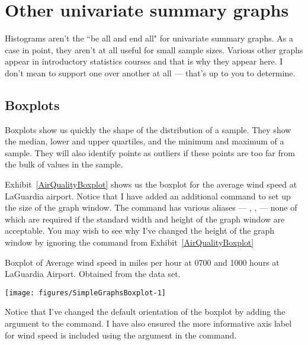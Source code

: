 \section{Other univariate summary graphs}

Histograms aren't the ``be all and end all" for univariate summary graphs. As a case in point, they aren't at all useful for small sample sizes. Various other graphs appear in introductory statistics courses and that is why they appear here. I don't mean to support one over another at all --- that's up to you to determine.

\subsection{Boxplots}

Boxplots show us quickly the shape of the distribution of a sample. They show the median, lower and upper quartiles, and the minimum and maximum of a sample. They will also identify points as outliers if these points are too far from the bulk of values in the sample.

Exhibit~\ref{AirQualityBoxplot} shows us the boxplot for the average wind speed at LaGuardia airport. Notice that I have added an additional command to set up the size of the graph window. The  command has various aliases --- , ,  --- none of which are required if the standard width and height of the graph window are acceptable. You may wish to see why I've changed the height of the graph window by ignoring the  command from Exhibit~\ref{AirQualityBoxplot}

\begin{exhibit}
\begin{center}
\caption{Boxplot of Average wind speed in miles per hour at 0700 and 1000 hours at LaGuardia Airport. Obtained from the  data set.}
\label{AirQualityBoxplot}
\begin{Schunk}

\texttt{[image: figures/SimpleGraphsBoxplot-1]} \end{Schunk}
\end{center}
\end{exhibit}

Notice that I've changed the default orientation of the boxplot by adding the argument  to the  command. I have also ensured the more informative axis label for wind speed is included using the  argument in the command.

